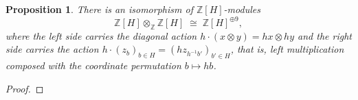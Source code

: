 \documentclass[12pt,a4paper]{article}
\newtheorem{proposition}[theorem]{Proposition}
\theoremstyle{definition}
\DeclareMathOperator{\Ind}{Ind}
\DeclareMathOperator{\Res}{Res}
\begin{document}
\begin{proposition}\label{prop:tensor-reg-ZH}
There is an isomorphism of \(\mathbb{Z}[H]\)-modules
\[
\mathbb{Z}[H] \otimes_{\mathbb{Z}} \mathbb{Z}[H] \;\cong\; \mathbb{Z}[H]^{\oplus
9},
\]
where the left side carries the diagonal action
\(h \cdot (x \otimes y) = hx \otimes hy\) and the right side
carries the action \(h \cdot (z_b)_{b \in H} = (h z_{h^{-1} b'})_{b' \in H}\),
that is, left multiplication composed with the coordinate permutation
\(b \mapsto hb\).
\end{proposition}

\begin{proof}


\end{proof}
\end{document}
